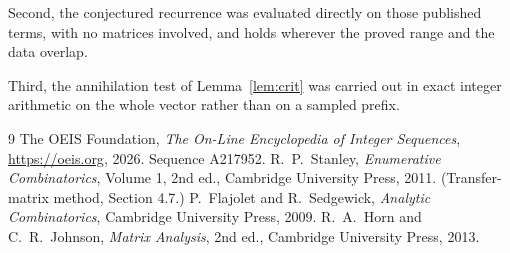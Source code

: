 \documentclass[11pt,a4paper]{article}
\theoremstyle{plain}
\theoremstyle{definition}
\begin{document}
Second, the conjectured recurrence was evaluated directly on those published terms, with no
matrices involved, and holds wherever the proved range and the data overlap.

Third, the annihilation test of Lemma~\ref{lem:crit} was carried out in exact integer
arithmetic on the whole vector rather than on a sampled prefix.

\begin{thebibliography}{9}
 The OEIS Foundation, \emph{The On-Line Encyclopedia of Integer
Sequences}, \url{https://oeis.org}, 2026. Sequence A217952.
 R.~P.~Stanley, \emph{Enumerative Combinatorics}, Volume 1, 2nd ed.,
Cambridge University Press, 2011. (Transfer-matrix method, Section 4.7.)
 P.~Flajolet and R.~Sedgewick, \emph{Analytic Combinatorics}, Cambridge
University Press, 2009.
 R.~A.~Horn and C.~R.~Johnson, \emph{Matrix Analysis}, 2nd ed., Cambridge
University Press, 2013.
\end{thebibliography}
\end{document}
